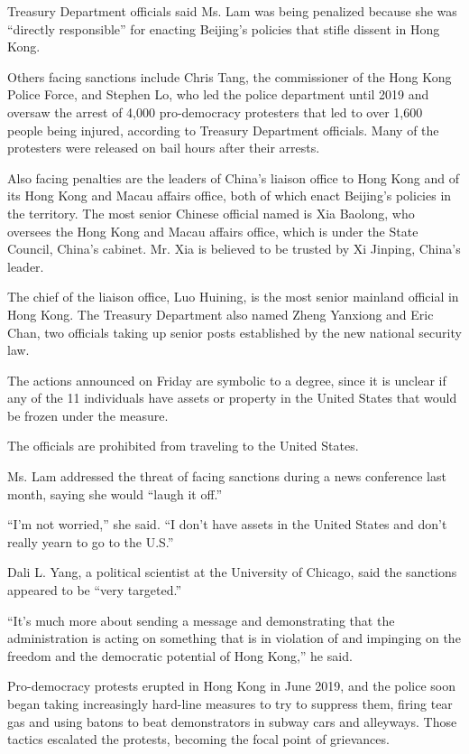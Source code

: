 Treasury Department officials said Ms. Lam was being penalized because
she was ``directly responsible'' for enacting Beijing's policies that
stifle dissent in Hong Kong.

Others facing sanctions include Chris Tang, the commissioner of the Hong
Kong Police Force, and Stephen Lo, who led the police department until
2019 and oversaw the arrest of 4,000 pro-democracy protesters that led
to over 1,600 people being injured, according to Treasury Department
officials. Many of the protesters were released on bail hours after
their arrests.

Also facing penalties are the leaders of China's liaison office to Hong
Kong and of its Hong Kong and Macau affairs office, both of which enact
Beijing's policies in the territory. The most senior Chinese official
named is Xia Baolong, who oversees the Hong Kong and Macau affairs
office, which is under the State Council, China's cabinet. Mr. Xia is
believed to be trusted by Xi Jinping, China's leader.

The chief of the liaison office, Luo Huining, is the most senior
mainland official in Hong Kong. The Treasury Department also named Zheng
Yanxiong and Eric Chan, two officials taking up senior posts established
by the new national security law.

The actions announced on Friday are symbolic to a degree, since it is
unclear if any of the 11 individuals have assets or property in the
United States that would be frozen under the measure.

The officials are prohibited from traveling to the United States.

Ms. Lam addressed the threat of facing sanctions during a news
conference last month, saying she would ``laugh it off.''

``I'm not worried,'' she said. ``I don't have assets in the United
States and don't really yearn to go to the U.S.''

Dali L. Yang, a political scientist at the University of Chicago, said
the sanctions appeared to be ``very targeted.''

``It's much more about sending a message and demonstrating that the
administration is acting on something that is in violation of and
impinging on the freedom and the democratic potential of Hong Kong,'' he
said.

Pro-democracy protests erupted in Hong Kong in June 2019, and the police
soon began taking increasingly hard-line measures to try to suppress
them, firing tear gas and using batons to beat demonstrators in subway
cars and alleyways. Those tactics escalated the protests, becoming the
focal point of grievances.

